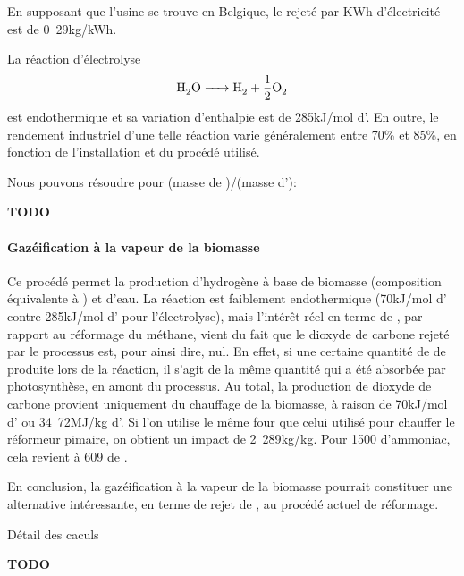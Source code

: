 \documentclass[10pt,a4paper]{report}
\begin{document}
En supposant que l'usine se trouve en Belgique, le  rejeté par KWh d'électricité est de \unit{0.29}{kg/kWh}.

La réaction d'électrolyse $$\ce{H2O -> H2 + \frac{1}{2} O2}$$ est endothermique et sa variation d'enthalpie est de \unit{285}{kJ/mol} d'. En outre, le rendement industriel d'une telle réaction varie généralement entre \unit{70}{\%} et \unit{85}{\%}, en fonction de l'installation et du procédé utilisé.

Nous pouvons résoudre pour (masse de )/(masse d'):

\begin{center}
\textbf{TODO}
\end{center}
\paragraph{Gazéification à la vapeur de la biomasse}
Ce procédé permet la production d'hydrogène à base de biomasse (composition équivalente à ) et d'eau. La réaction est faiblement endothermique  (\unit{70}{kJ/mol} d' contre \unit{285}{kJ/mol} d' pour l'électrolyse), mais l'intérêt réel en terme de , par rapport au réformage du méthane, vient du fait que le dioxyde de carbone rejeté par le processus est, pour ainsi dire, nul. En effet, si une certaine quantité de  de produite lors de la réaction, il s'agit de la même quantité qui a été absorbée par photosynthèse, en amont du processus.
 Au total, la production de dioxyde de carbone provient uniquement du chauffage de la biomasse, à raison de \unit{70}{kJ/mol} d' ou \unit{34.72}{MJ/kg} d'. Si l'on utilise le même four que celui utilisé pour chauffer le réformeur pimaire, on obtient un impact  de \unit{2.289}{kg/kg}. Pour \unit{1500}{\tonne} d'ammoniac, cela revient à \unit{609}{\tonne} de . 
 
En conclusion, la gazéification à la vapeur de la biomasse pourrait constituer une alternative intéressante, en terme de rejet de , au procédé actuel de réformage.

Détail des caculs
\begin{center}
\textbf{TODO}
\end{center}
\end{document}
